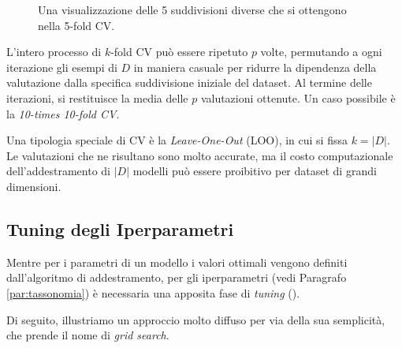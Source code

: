 \begin{figure}[h]
    \centering
    \begin{center}
    \end{center}
    \caption{Una visualizzazione delle 5 suddivisioni diverse che si ottengono nella 5-fold CV.}
    \label{fig:cross-validation}
\end{figure}

L'intero processo di $k$-fold CV può essere ripetuto $p$ volte, permutando a ogni iterazione gli esempi di $D$ in maniera casuale per ridurre la dipendenza della valutazione dalla specifica suddivisione iniziale del dataset. Al termine delle iterazioni, si restituisce la media delle $p$ valutazioni ottenute. Un caso possibile è la \textit{10-times 10-fold CV}.

Una tipologia speciale di CV è la \textit{Leave-One-Out} (LOO), in cui si fissa $k = |D|$. Le valutazioni che ne risultano sono molto accurate, ma il costo computazionale dell'addestramento di $|D|$ modelli può essere proibitivo per dataset di grandi dimensioni.


\subsection{Tuning degli Iperparametri}
Mentre per i parametri di un modello i valori ottimali vengono definiti dall'algoritmo di addestramento, per gli iperparametri (vedi Paragrafo \ref{par:tassonomia}) è necessaria una apposita fase di \textit{tuning} (\cite{feurer2019hpo}). 

Di seguito, illustriamo un approccio molto diffuso per via della sua semplicità, che prende il nome di \textit{grid search}.

